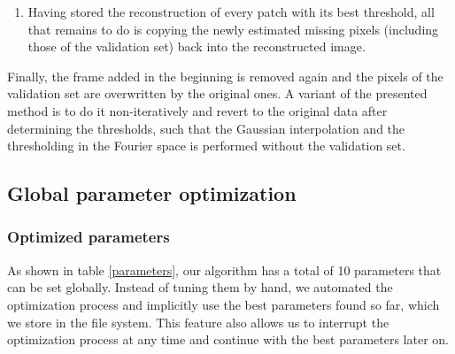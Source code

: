 \documentclass[10pt,conference,compsocconf]{IEEEtran}
\begin{document}
\begin{enumerate}
\item Having stored the reconstruction of every patch with its best threshold, all that remains to do is copying the newly estimated missing pixels (including those of the validation set) back into the reconstructed image.
\end{enumerate}
Finally, the frame added in the beginning is removed again and the pixels of the validation set are overwritten by the original ones. A variant of the presented method is to do it non-iteratively and revert to the original data after determining the thresholds, such that the Gaussian interpolation and the thresholding in the Fourier space is performed without the validation set.

\subsection{Global parameter optimization}
\subsubsection{Optimized parameters}
As shown in table \ref{parameters}, our algorithm has a total of 10 parameters that can be set globally. Instead of tuning them by hand, we automated the optimization process and implicitly use the best parameters found so far, which we store in the file system. This feature also allows us to interrupt the optimization process at any time and continue with the best parameters later on.
\end{document}
